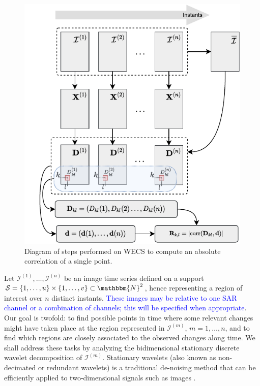 \documentclass[journal]{IEEEtran}
\begin{document}
\begin{figure}[htb!]
\centering
\includegraphics[scale=.8]{../../drawio/diagram_wecs.drawio_11nov21}
\caption{Diagram of steps performed on WECS to compute an absolute correlation of a single point.}
\label{figDiagram}
\end{figure}




Let $\mathcal{I}^{(1)},\ldots,\mathcal{I}^{(n)}$ be an image time series defined on a support $\mathcal{S} = \left\lbrace 1,\ldots,u  \right\rbrace \times \left\lbrace 1,\ldots,v  \right\rbrace \subset \mathbbm{N}^2$, hence representing a region of interest over $n$ distinct instants.
%
\textcolor{blue}{These images may be relative to one SAR channel or a combination of channels; this will be specified when appropriate}. Our goal is twofold: to find possible points in time where some relevant changes might have taken place at the region represented in $\mathcal{I}^{(m)}$, $m=1,\ldots,n$, and to find which regions are closely associated to the observed changes along time. We shall address these tasks by analyzing the bidimensional stationary discrete wavelet decomposition of $\mathcal{I}^{(m)}$. Stationary wavelets (also known as non-decimated or redundant wavelets) is a traditional de-noising method that can be efficiently applied to two-dimensional signals such as images \cite{coifman1995translation,atto2012multidate,atto2016wavelet}. 
\end{document}

